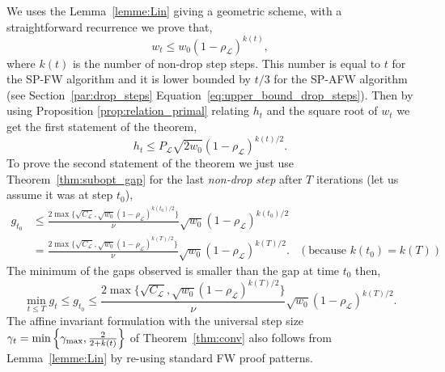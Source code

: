 \documentclass[twoside]{article}
\renewcommand{\L}{\mathcal{L}}
\newcommand{\gap}{g_{t}}
\newcommand{\CondNumb}{\nu}
\newcommand{\stepsize}{\gamma}
\newcommand{\stepmax}{\stepsize_{\textnormal{\scriptsize max}}} %
\newcommand{\0}{\mathbf{0}} %
\begin{document}
  \proof
  We uses the Lemma~\ref{lemme:Lin} giving a geometric scheme, with a straightforward recurrence we prove that,
    \begin{equation}
      w_t \leq w_0 (1-\rho_\L)^{k(t)},
    \end{equation}
    where $k(t)$ is the number of non-drop step steps. This number is equal to $t$ for the SP-FW algorithm and it is lower bounded by $t/3$ for the SP-AFW algorithm (see Section~\ref{par:drop_steps} Equation~\eqref{eq:upper_bound_drop_steps}).
    Then by using Proposition \eqref{prop:relation_primal}  relating $h_t$ and the square root of $w_t$ we get the first statement of the theorem,
      \begin{equation}
       h_t \leq   P_\L \sqrt{2w_0}(1- \rho_\L)^{k(t)/2}.
      \end{equation}
    To prove the second statement of the theorem we just use Theorem~\ref{thm:subopt_gap} for the last \emph{non-drop step} after $T$ iterations (let us assume it was at step $t_0$),
    \begin{align}
     g_{t_0} &\leq   \frac{2 \max\{\sqrt{C_\L},\sqrt{w_0} (1-\rho_\L)^{k(t_0)/2}\}}{\CondNumb{}} \sqrt{w_0}(1- \rho_\L)^{k(t_0)/2} &\\
          &=\frac{2\max\{\sqrt{C_\L},\sqrt{w_0} (1-\rho_\L)^{k(T)/2}\}}{\CondNumb{}} \sqrt{w_0}(1- \rho_\L)^{k(T)/2}. & (\text{because } k(t_0)= k(T))
    \end{align}
    The minimum of the gaps observed is smaller than the gap at time $t_0$ then,
    \begin{equation}
      \min_{t\leq T}\gap \leq g_{t_0} \leq \frac{2\max\{\sqrt{C_\L},\sqrt{w_0} (1-\rho_\L)^{k(T)/2}\}}{\CondNumb{}} \sqrt{w_0}(1- \rho_\L)^{k(T)/2}.
    \end{equation}
  \endproof
  The affine invariant formulation with the universal step size $\stepsize_t = \min \left\{\stepmax,\frac{2}{2+k(t)}\right\}$ of Theorem~\ref{thm:conv} also follows from Lemma~\ref{lemme:Lin} by re-using standard FW proof patterns.
\end{document}
